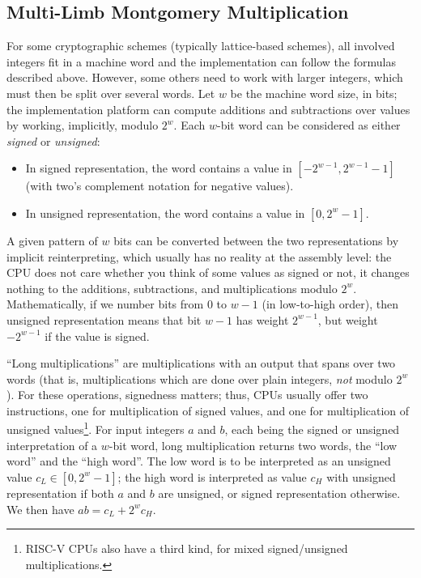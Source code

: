 \documentclass{llncs}
\begin{document}
\subsection{Multi-Limb Montgomery Multiplication}

For some cryptographic schemes (typically lattice-based schemes), all
involved integers fit in a machine word and the implementation can
follow the formulas described above. However, some others need to work
with larger integers, which must then be split over several words. Let
$w$ be the machine word size, in bits; the implementation platform can
compute additions and subtractions over values by working, implicitly,
modulo $2^w$. Each $w$-bit word can be considered as either
\emph{signed} or \emph{unsigned}:
\begin{itemize}

    \item In signed representation, the word contains a value in
    $[-2^{w-1}, 2^{w-1}-1]$ (with two's complement notation for
    negative values).

    \item In unsigned representation, the word contains a value in
    $[0, 2^w - 1]$.

\end{itemize}
A given pattern of $w$ bits can be converted between the two
representations by implicit reinterpreting, which usually has no reality
at the assembly level: the CPU does not care whether you think of some
values as signed or not, it changes nothing to the additions,
subtractions, and multiplications modulo $2^w$. Mathematically, if we
number bits from $0$ to $w-1$ (in low-to-high order), then unsigned
representation means that bit $w-1$ has weight $2^{w-1}$, but weight
$-2^{w-1}$ if the value is signed.

``Long multiplications'' are multiplications with an output that spans
over two words (that is, multiplications which are done over plain
integers, \emph{not} modulo $2^w$). For these operations, signedness
matters; thus, CPUs usually offer two instructions, one for
multiplication of signed values, and one for multiplication of unsigned
values\footnote{RISC-V CPUs also have a third kind, for mixed
signed/unsigned multiplications.}. For input integers $a$ and $b$, each
being the signed or unsigned interpretation of a $w$-bit word, long
multiplication returns two words, the ``low word'' and the ``high
word''. The low word is to be interpreted as an unsigned value $c_L \in
[0, 2^w - 1]$; the high word is interpreted as value $c_H$ with unsigned
representation if both $a$ and $b$ are unsigned, or signed
representation otherwise. We then have $ab = c_L + 2^w c_H$.
\end{document}
